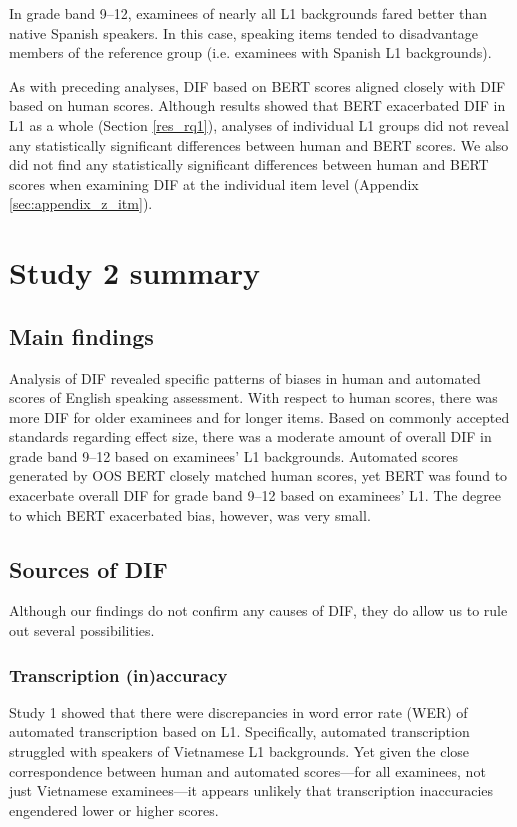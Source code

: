 \documentclass [PhD] {uclathes}
\begin{document}
In grade band 9–12, examinees of nearly all L1 backgrounds fared better than native Spanish speakers. In this case, speaking items tended to disadvantage members of the reference group (i.e. examinees with Spanish L1 backgrounds). 

As with preceding analyses, DIF based on BERT scores aligned closely with DIF based on human scores. Although results showed that BERT exacerbated DIF in L1 as a whole (Section \ref{res_rq1}), analyses of individual L1 groups did not reveal any statistically significant differences between human and BERT scores. We also did not find any statistically significant differences between human and BERT scores when examining DIF at the individual item level (Appendix \ref{sec:appendix_z_itm}). 

\section{Study 2 summary}

\subsection{Main findings}

Analysis of DIF revealed specific patterns of biases in human and automated scores of English speaking assessment. With respect to human scores, there was more DIF for older examinees and for longer items. Based on commonly accepted standards regarding effect size, there was a moderate amount of overall DIF in grade band 9–12 based on examinees’ L1 backgrounds. Automated scores generated by OOS BERT closely matched human scores, yet BERT was found to exacerbate overall DIF for grade band 9–12 based on examinees’ L1. The degree to which BERT exacerbated bias, however, was very small.

\subsection{Sources of DIF}

Although our findings do not confirm any causes of DIF, they do allow us to rule out several possibilities. 

\subsubsection{Transcription (in)accuracy}

Study 1 showed that there were discrepancies in word error rate (WER) of automated transcription based on L1. Specifically, automated transcription struggled with speakers of Vietnamese L1 backgrounds. Yet given the close correspondence between human and automated scores—for all examinees, not just Vietnamese examinees—it appears unlikely that transcription inaccuracies engendered lower or higher scores. 
\end{document}
